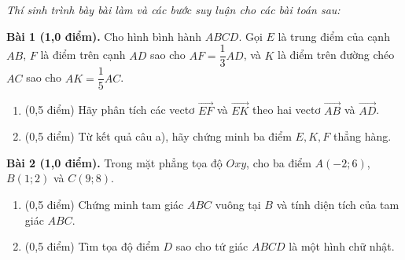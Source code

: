 \documentclass[10pt,a4paper]{article}
\newcommand{\parttitle}[1]{\par\vspace{3.5pt}\needspace{3\baselineskip}{\large\bfseries\color{ink}#1}\par\nopagebreak\vspace{2pt}}
\begin{document}
\vspace{3pt}
\parttitle{PHẦN IV. Tự luận}
\textit{Thí sinh trình bày bài làm và các bước suy luận cho các bài toán sau:}

\vspace{4pt}
\textbf{Bài 1 (1,0 điểm).} Cho hình bình hành $ABCD$. Gọi $E$ là trung điểm của cạnh $AB$, $F$ là điểm trên cạnh $AD$ sao cho $AF = \dfrac{1}{3}AD$, và $K$ là điểm trên đường chéo $AC$ sao cho $AK = \dfrac{1}{5}AC$.
\begin{enumerate}[label=\alph*), itemsep=2pt]
    \item (0,5 điểm) Hãy phân tích các vectơ $\vec{EF}$ và $\vec{EK}$ theo hai vectơ $\vec{AB}$ và $\vec{AD}$.
    \item (0,5 điểm) Từ kết quả câu a), hãy chứng minh ba điểm $E, K, F$ thẳng hàng.
\end{enumerate}

\vspace{6pt}
\textbf{Bài 2 (1,0 điểm).} Trong mặt phẳng tọa độ $Oxy$, cho ba điểm $A(-2; 6)$, $B(1; 2)$ và $C(9; 8)$.
\begin{enumerate}[label=\alph*), itemsep=2pt]
    \item (0,5 điểm) Chứng minh tam giác $ABC$ vuông tại $B$ và tính diện tích của tam giác $ABC$.
    \item (0,5 điểm) Tìm tọa độ điểm $D$ sao cho tứ giác $ABCD$ là một hình chữ nhật.
\end{enumerate}
\end{document}
